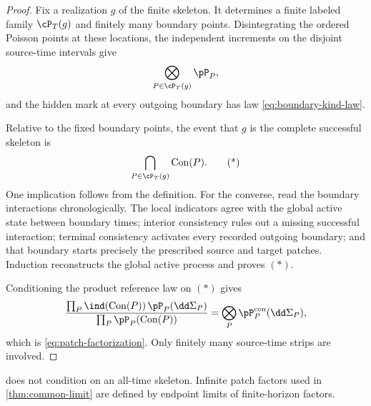 \begin{proof}
Fix a realization \(g\) of the finite skeleton. It determines a
finite labeled family \(\cP_T(g)\) and finitely many boundary points.
Disintegrating the ordered Poisson points at these locations, the
independent increments on the disjoint source-time intervals give
\[
  \bigotimes_{P\in\cP_T(g)}\pP_P,
\]
and the hidden mark at every outgoing boundary has law
\eqref{eq:boundary-kind-law}.

Relative to the fixed boundary points, the event that \(g\) is the
complete successful skeleton is
\[
  \bigcap_{P\in\cP_T(g)}\operatorname{Con}(P).
  \tag{*}
\]
One implication follows from the definition. For the converse, read
the boundary interactions chronologically. The local indicators agree
with the global active state between boundary times; interior
consistency rules out a missing successful interaction; terminal
consistency activates every recorded outgoing boundary; and that
boundary starts precisely the prescribed source and target patches.
Induction reconstructs the global active process and proves \((*)\).

Conditioning the product reference law on \((*)\) gives
\[
  \frac{
    \prod_P
    \ind(\operatorname{Con}(P))\,\pP_P(\dd\Sigma_P)
  }{
    \prod_P\pP_P(\operatorname{Con}(P))
  }
  =
  \bigotimes_P\pP_P^{\mathrm{con}}(\dd\Sigma_P),
\]
which is \eqref{eq:patch-factorization}. Only finitely many
source-time strips are involved.
\end{proof}

\begin{remark}
\label{rem:finite-horizon-factorization}
 does not condition on an all-time
skeleton. Infinite patch factors used in
\cref{thm:common-limit} are defined by endpoint limits of
finite-horizon factors.
\end{remark}
